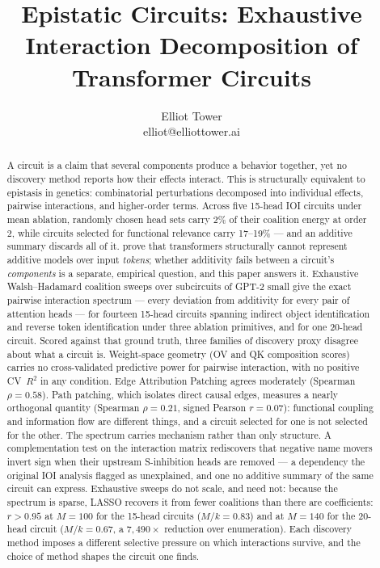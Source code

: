\documentclass{article}
\title{Epistatic Circuits: Exhaustive Interaction Decomposition of Transformer Circuits}
\author{\name Elliot Tower \\
      \email elliot@elliottower.ai}
\begin{document}
\maketitle

\begin{abstract}
A circuit is a claim that several components produce a behavior together, yet no
discovery method reports how their effects interact. This is structurally equivalent
to epistasis in genetics: combinatorial perturbations decomposed into individual
effects, pairwise interactions, and higher-order terms. Across five 15-head IOI
circuits under mean ablation, randomly chosen head sets carry 2\% of their coalition
energy at order 2, while circuits selected for functional relevance carry 17--19\% ---
and an additive summary discards all of it. \citet{leemann2024slalom} prove that transformers structurally cannot
represent additive models over input \emph{tokens}; whether additivity fails between a
circuit's \emph{components} is a separate, empirical question, and this paper answers
it. Exhaustive
Walsh--Hadamard coalition sweeps over subcircuits of GPT-2 small give the exact
pairwise interaction spectrum --- every deviation from additivity for every pair of
attention heads --- for fourteen 15-head circuits spanning indirect object
identification and reverse token identification under three ablation primitives, and
for one 20-head circuit.
Scored against that ground truth, three families of discovery proxy disagree about what
a circuit is. Weight-space geometry (OV and QK composition scores) carries no
cross-validated predictive power for pairwise interaction, with no positive CV~$R^2$ in
any condition. Edge Attribution Patching agrees moderately (Spearman $\rho = 0.58$).
Path patching, which isolates direct causal edges, measures a nearly orthogonal
quantity (Spearman $\rho = 0.21$, signed Pearson $r = 0.07$): functional coupling and
information flow are different things, and a circuit selected for one is not selected
for the other.
The spectrum carries mechanism rather than only structure. A complementation test on
the interaction matrix rediscovers that negative name movers invert sign when their
upstream S-inhibition heads are removed --- a dependency the original IOI analysis
flagged as unexplained, and one no additive summary of the same circuit can express.
Exhaustive sweeps do not scale, and need not: because the spectrum is sparse, LASSO
recovers it from fewer coalitions than there are coefficients: $r > 0.95$ at
$M = 100$ for the 15-head circuits ($M/k = 0.83$) and at $M = 140$ for the 20-head
circuit ($M/k = 0.67$, a $7{,}490\times$ reduction over enumeration). Each discovery method imposes a different
selective pressure on which interactions survive, and the choice of method shapes the
circuit one finds.
\end{abstract}
\end{document}

